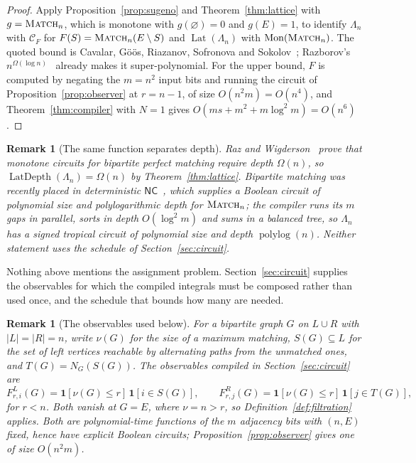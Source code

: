 \documentclass[11pt]{article}
\newtheorem{remark}[theorem]{Remark}
\begin{document}
\begin{proof}
Apply Proposition~\ref{prop:sugeno} and Theorem~\ref{thm:lattice} with
$g=\textsc{Match}_n$, which is monotone with $g(\varnothing)=0$ and $g(E)=1$, to
identify $\Lambda_n$ with $\mathcal C_F$ for $F(S)=\textsc{Match}_n(E\setminus S)$
and $\operatorname{Lat}(\Lambda_n)$ with $\operatorname{Mon}(\textsc{Match}_n)$.
The quoted bound is Cavalar, G\"o\"os, Riazanov, Sofronova and
Sokolov~\cite{cgrss26}; Razborov's $n^{\Omega(\log n)}$~\cite{razborov85} already
makes it super-polynomial.  For the upper bound, $F$ is computed by negating the
$m=n^{2}$ input bits and running the circuit of
Proposition~\ref{prop:observer} at $r=n-1$, of size $O(n^{2}m)=O(n^{4})$, and
Theorem~\ref{thm:compiler} with $N=1$ gives $O(ms+m^{2}+m\log^{2}m)=O(n^{6})$.
\end{proof}

\begin{remark}[The same function separates depth]
\label{rem:depth-separation}
Raz and Wigderson~\cite{raz-wigderson92} prove that monotone circuits for
bipartite perfect matching require depth $\Omega(n)$, so
$\operatorname{LatDepth}(\Lambda_n)=\Omega(n)$ by Theorem~\ref{thm:lattice}.
Bipartite matching was recently placed in deterministic
$\mathsf{NC}$~\cite{cgnc26}, which supplies a Boolean circuit of polynomial size
and polylogarithmic depth for $\textsc{Match}_n$; the compiler runs its $m$ gaps
in parallel, sorts in depth $O(\log^{2}m)$ and sums in a balanced tree, so
$\Lambda_n$ has a signed tropical circuit of polynomial size and depth
$\operatorname{polylog}(n)$.  Neither statement uses the schedule of
Section~\ref{sec:circuit}.
\end{remark}

Nothing above mentions the assignment problem.  Section~\ref{sec:circuit}
supplies the observables for which the compiled integrals must be composed
rather than used once, and the schedule that bounds how many are needed.

\begin{remark}[The observables used below]
\label{rem:observers}
For a bipartite graph $G$ on $L\cup R$ with $|L|=|R|=n$, write $\nu(G)$ for the
size of a maximum matching, $S(G)\subseteq L$ for the set of left vertices
reachable by alternating paths from the unmatched ones, and $T(G)=N_G(S(G))$.
The observables compiled in Section~\ref{sec:circuit} are
\begin{equation}
  F^{L}_{r,i}(G)=\mathbf1[\nu(G)\le r]\,\mathbf1[i\in S(G)],
  \qquad
  F^{R}_{r,j}(G)=\mathbf1[\nu(G)\le r]\,\mathbf1[j\in T(G)],
  \label{eq:observables}
\end{equation}
for $r<n$.  Both vanish at $G=E$, where $\nu=n>r$, so
Definition~\ref{def:filtration} applies.  Both are polynomial-time functions of
the $m$ adjacency bits with $(n,E)$ fixed, hence have explicit Boolean circuits;
Proposition~\ref{prop:observer} gives one of size $O(n^{2}m)$.
\end{remark}
\end{document}
